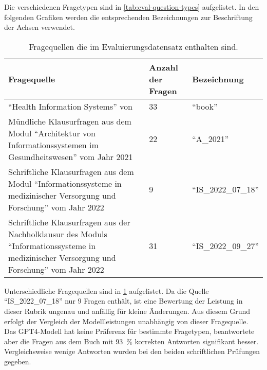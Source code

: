 Die verschiedenen Fragetypen sind in \cref{tab:eval-question-types} aufgelistet.
In den folgenden Grafiken werden die entsprechenden Bezeichnungen zur Beschriftung der Achsen verwendet.
\begin{table}
    \centering
    \begin{tabularx}{\textwidth}{Xll}
        \toprule
        \textbf{Fragequelle}                                                                                                                               & \textbf{Anzahl der Fragen} & \textbf{Bezeichnung}       \\
        \midrule
        \enquote{Health Information Systems} von \citet{bb}                                                                                                & 33                         & \enquote{book}             \\
        \midrule
        Mündliche Klausurfragen aus dem Modul \enquote{Architektur von Informationssystemen im Gesundheitswesen} vom Jahr 2021                             & 22                         & \enquote{A\_2021}          \\
        \midrule
        Schriftliche Klausurfragen aus dem Modul \enquote{Informationssysteme in medizinischer Versorgung und Forschung} vom Jahr 2022                     & 9                          & \enquote{IS\_2022\_07\_18} \\
        \midrule
        Schriftliche Klausurfragen aus der Nachholklausur des Moduls \enquote{Informationssysteme in medizinischer Versorgung und Forschung} vom Jahr 2022 & 31                         & \enquote{IS\_2022\_09\_27} \\
        \bottomrule
    \end{tabularx}
    \caption{Fragequellen die im Evaluierungsdatensatz enthalten sind.}\label{tab:eval-question-sources}
\end{table}


Unterschiedliche Fragequellen sind in \cref{tab:eval-question-sources} aufgelistet.
Da die Quelle \enquote{IS\_2022\_07\_18} nur 9 Fragen enthält, ist eine Bewertung der Leistung in dieser Rubrik ungenau und anfällig für kleine Änderungen.
Aus diesem Grund erfolgt der Vergleich der Modellleistungen unabhängig von dieser Fragequelle.\\


Das GPT4-Modell hat keine Präferenz für bestimmte Fragetypen, beantwortete aber die Fragen aus dem Buch mit \SI{93}{\percent} korrekten Antworten signifikant besser.
Vergleichsweise wenige Antworten wurden bei den beiden schriftlichen Prüfungen gegeben.\\


